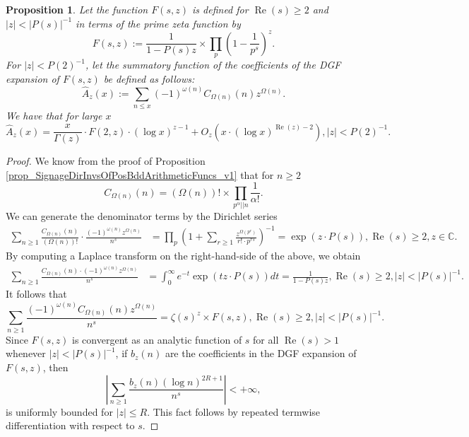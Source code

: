 \documentclass[11pt,reqno,a4letter]{article}
\numberwithin{figure}{section}
\numberwithin{table}{section}
\theoremstyle{plain}
\newtheorem{prop}[theorem]{Proposition}
\numberwithin{theorem}{section}
\theoremstyle{definition}
\renewcommand{\Re}{\operatorname{Re}}
\begin{document}
\begin{prop} 
\label{prop_HatAzx_ModSummatoryFuncExps_RelatedToCkn} 
Let the function $F(s, z)$ is defined for $\Re(s) \geq 2$ and $|z| < |P(s)|^{-1}$ 
in terms of the prime zeta function by 
\[
F(s, z) := \frac{1}{1-P(s) z} 
     \times \prod_p \left(1 - \frac{1}{p^s}\right)^{z}. 
\]
For $|z| < P(2)^{-1}$, let the summatory function of the coefficients of the 
DGF expansion of $F(s, z)$ be defined as follows: 
\[
\widehat{A}_z(x) := \sum_{n \leq x} (-1)^{\omega(n)} 
     C_{\Omega(n)}(n) z^{\Omega(n)}. 
\]
We have that for large $x$ 
\[
\widehat{A}_z(x) = \frac{x}{\Gamma(z)} \cdot F(2, z) \cdot (\log x)^{z-1} + 
     O_{z}\left(x \cdot (\log x)^{\Re(z) - 2}\right), |z| < P(2)^{-1}. 
\]
\end{prop} 
\begin{proof} 
We know from the proof of 
Proposition \ref{prop_SignageDirInvsOfPosBddArithmeticFuncs_v1} that for $n \geq 2$ 
\[
C_{\Omega(n)}(n) = (\Omega(n))! \times \prod_{p^{\alpha}||n} \frac{1}{\alpha!}. 
\]
We can generate the denominator terms by the Dirichlet series 
\begin{align*} 
\sum_{n \geq 1} \frac{C_{\Omega(n)}(n)}{(\Omega(n))!} \cdot 
     \frac{(-1)^{\omega(n)} z^{\Omega(n)}}{n^s} & = \prod_p \left(1 + \sum_{r \geq 1} 
     \frac{z^{\Omega(p^r)}}{r! \cdot p^{rs}}\right)^{-1} 
     = \exp\left(z \cdot P(s)\right), \Re(s) \geq 2, z \in \mathbb{C}. 
\end{align*} 
By computing a Laplace transform on the right-hand-side of the above, we obtain 
\begin{align*} 
\sum_{n \geq 1} \frac{C_{\Omega(n)}(n) \cdot (-1)^{\omega(n)} z^{\Omega(n)}}{n^s} & = 
     \int_0^{\infty} e^{-t} \exp\left(tz \cdot P(s)\right) dt = \frac{1}{1 - P(s) z}, 
     \Re(s) \geq 2, |z| < |P(s)|^{-1}. 
\end{align*} 
It follows that 
\[
\sum_{n \geq 1} \frac{(-1)^{\omega(n)} C_{\Omega(n)}(n) z^{\Omega(n)}}{n^s} = 
     \zeta(s)^z \times F(s, z), \Re(s) \geq 2, |z| < |P(s)|^{-1}. 
\]
Since $F(s, z)$ is convergent as an analytic function of $s$ for all $\Re(s) > 1$ 
whenever $|z| < |P(s)|^{-1}$, 
if $b_z(n)$ are the coefficients in the DGF expansion of $F(s, z)$, then 
\[
\left\lvert \sum_{n \geq 1} \frac{b_z(n) (\log n)^{2R+1}}{n^s} \right\rvert < +\infty, 
\]
is uniformly bounded for $|z| \leq R$. This fact follows by repeated termwise differentiation 
with respect to $s$. 


\end{proof}
\end{document}
